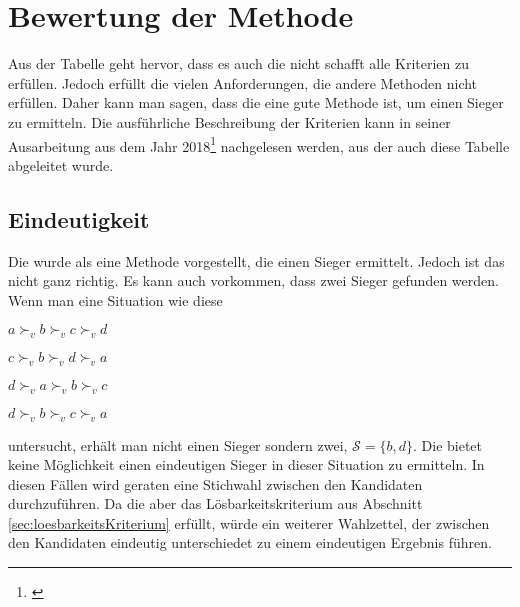\section{Bewertung der Methode}
\label{sec:Bewertung1}









Aus der Tabelle geht hervor, dass es auch die \schulze nicht schafft alle Kriterien zu erfüllen. Jedoch erfüllt die \schulze vielen Anforderungen, die andere Methoden nicht erfüllen. Daher kann man sagen, dass die \schulze eine gute \condorcet Methode ist, um einen Sieger zu ermitteln. Die ausführliche Beschreibung der Kriterien kann in seiner Ausarbeitung aus dem Jahr 2018\footnote{\Vgl \citet{Schulze2018}} nachgelesen werden, aus der auch diese Tabelle abgeleitet wurde.
\newpage

\subsection{Eindeutigkeit}
\label{sec:eindeutigkeit}
Die \schulze wurde als eine Methode vorgestellt, die einen Sieger ermittelt. Jedoch ist das nicht ganz richtig. Es kann auch vorkommen, dass zwei Sieger gefunden werden. Wenn man eine Situation wie diese

\begin{description}
\centering
\item[3 mal] $a \succ_{v} b \succ_{v} c \succ_{v}d$
\item[2 mal] $c \succ_{v} b \succ_{v} d \succ_{v}a$
\item[2 mal] $d \succ_{v} a \succ_{v} b \succ_{v}c$
\item[2 mal] $d \succ_{v} b \succ_{v} c \succ_{v}a$
\end{description} 
untersucht, erhält man nicht einen Sieger sondern zwei, $\mathcal{S}=\{b,d\}$. Die \schulze bietet keine Möglichkeit einen eindeutigen Sieger in dieser Situation zu ermitteln. In diesen Fällen wird geraten eine Stichwahl zwischen den Kandidaten durchzuführen. Da die \schulze aber das Lösbarkeitskriterium  aus Abschnitt \ref{sec:loesbarkeitsKriterium} erfüllt, würde ein weiterer Wahlzettel, der zwischen den Kandidaten eindeutig unterschiedet zu einem eindeutigen Ergebnis führen.
